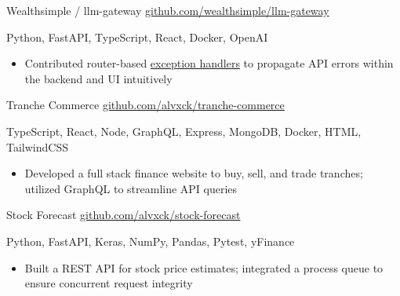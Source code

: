 \documentclass[9pt]{extarticle}
\begin{document}
\begin{adjustwidth}{14pt}{14pt}
	\vspace{-10pt}

	\textcolor{imptextblack}{Wealthsimple / llm-gateway} \hfill \href{https://github.com/wealthsimple/llm-gateway}{github.com/wealthsimple/llm-gateway}
	
	Python, FastAPI, TypeScript, React, Docker, OpenAI
	
	\begin{itemize}[topsep=0pt]
		\item Contributed router-based \href{https://github.com/wealthsimple/llm-gateway/pull/27}{exception handlers} to propagate API errors within the backend and UI intuitively
	\end{itemize}
	
	\vspace{5pt}
	\textcolor{imptextblack}{Tranche Commerce} \hfill \href{https://github.com/alvxck/tranche-commerce}{github.com/alvxck/tranche-commerce}
	
	TypeScript, React, Node, GraphQL, Express, MongoDB, Docker, HTML, TailwindCSS
	
	\begin{itemize}[topsep=0pt]
		\item Developed a full stack finance website to buy, sell, and trade tranches; utilized \textcolor{imptextblack}{GraphQL} to streamline API queries
	\end{itemize}
	
	\vspace{5pt}
	\textcolor{imptextblack}{Stock Forecast} \hfill \href{https://github.com/alvxck/stock-forecast}{github.com/alvxck/stock-forecast}
	
	Python, FastAPI, Keras, NumPy, Pandas, Pytest, yFinance
	
	\begin{itemize}[topsep=0pt]
		\item Built a REST API for stock price estimates; integrated a process \textcolor{imptextblack}{queue} to ensure concurrent request integrity
	\end{itemize}
\end{adjustwidth}
\end{document}
